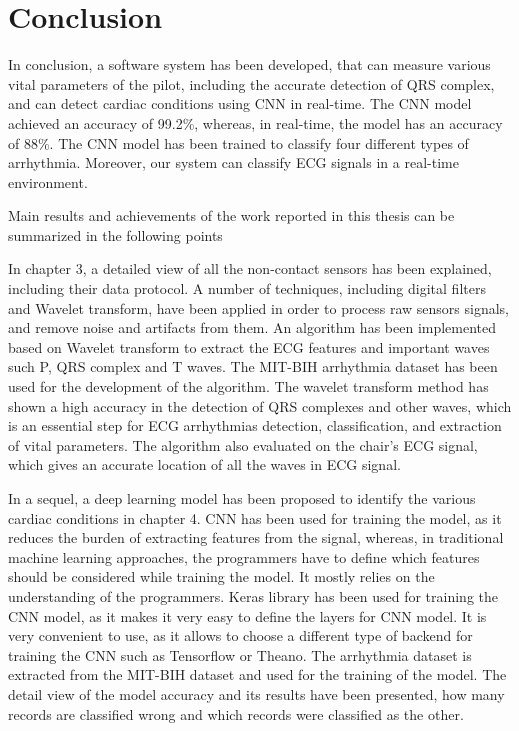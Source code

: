 \chapter{Conclusion}

In conclusion, a software system has been developed, that can measure various vital parameters of the pilot, including the accurate detection of QRS complex, and can detect cardiac conditions using CNN in real-time. The CNN model achieved an accuracy of 99.2\%, whereas, in real-time, the model has an accuracy of 88\%. The CNN model has been trained to classify four different types of arrhythmia. Moreover, our system can classify ECG signals in a real-time environment.

Main results and achievements of the work reported in this thesis can be summarized in the following points


In chapter 3, a detailed view of all the non-contact sensors has been explained, including their data protocol. A number of techniques, including digital filters and Wavelet transform, have been applied in order to process raw sensors signals, and remove noise and artifacts from them. An algorithm has been implemented based on Wavelet transform to extract the ECG features and important waves such P, QRS complex and T waves. The MIT-BIH arrhythmia dataset has been used for the development of the algorithm. The wavelet transform method has shown a high accuracy in the detection of QRS complexes and other waves, which is an essential step for ECG arrhythmias detection, classification, and extraction of vital parameters. The algorithm also evaluated on the chair's ECG signal, which gives an accurate location of all the waves in ECG signal.


In a sequel, a deep learning model has been proposed to identify the various cardiac conditions in chapter 4. CNN has been used for training the model, as it reduces the burden of extracting features from the signal, whereas, in traditional machine learning approaches, the programmers have to define which features should be considered while training the model. It mostly relies on the understanding of the programmers. Keras library has been used for training the CNN model, as it makes it very easy to define the layers for CNN model. It is very convenient to use, as it allows to choose a different type of backend for training the CNN such as Tensorflow or Theano. The arrhythmia dataset is extracted from the MIT-BIH dataset and used for the training of the model. The detail view of the model accuracy and its results have been presented, how many records are classified wrong and which records were classified as the other.


